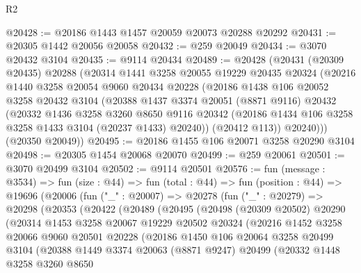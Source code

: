 \begin{lexlean}{R2}
\begin{coremodule}
@20428 := @20186 @1443 @1457 @20059 @20073 @20288 @20292
@20431 := @20305 @1442 @20056 @20058
@20432 := @259 @20049
@20434 := @3070 @20432 @3104
@20435 := @9114 @20434
@20489 := @20428
    (@20431
      (@20309 @20435)
      @20288
      (@20314
        @1441
        @3258
        @20055
        @19229
        @20435
        @20324
        (@20216
          @1440
          @3258
          @20054
          @9060
          @20434
          @20228
          (@20186
            @1438
            @106
            @20052
            @3258
            @20432
            @3104
            (@20388
              @1437
              @3374
              @20051
              (@8871 @9116)
              @20432
              (@20332
                @1436
                @3258
                @3260
                @8650
                @9116
                @20342
                (@20186 @1434 @106 @3258 @3258 @1433 @3104 (@20237 @1433) @20240))
              (@20412 @113))
            @20240)))
      (@20350 @20049))
@20495 := @20186 @1455 @106 @20071 @3258 @20290 @3104
@20498 := @20305 @1454 @20068 @20070
@20499 := @259 @20061
@20501 := @3070 @20499 @3104
@20502 := @9114 @20501
@20576 := fun (message : @3534) =>
  fun (size : @44) =>
  fun (total : @44) =>
  fun (position : @44) =>
  @19696
    (@20006
      (fun ("_" : @20007) =>
      @20278
        (fun ("_" : @20279) =>
        @20298
          (@20353
            (@20422
              (@20489
                (@20495
                  (@20498
                    (@20309 @20502)
                    @20290
                    (@20314
                      @1453
                      @3258
                      @20067
                      @19229
                      @20502
                      @20324
                      (@20216
                        @1452
                        @3258
                        @20066
                        @9060
                        @20501
                        @20228
                        (@20186
                          @1450
                          @106
                          @20064
                          @3258
                          @20499
                          @3104
                          (@20388
                            @1449
                            @3374
                            @20063
                            (@8871 @9247)
                            @20499
                            (@20332
                              @1448
                              @3258
                              @3260
                              @8650

\end{coremodule}
\end{lexlean}

